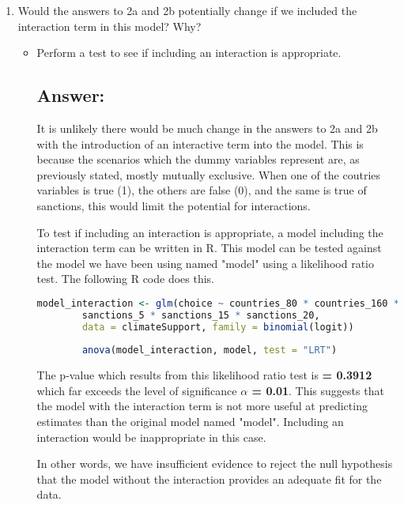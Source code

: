 \documentclass[12pt,letterpaper]{article}
\begin{document}
\begin{enumerate}
\begin{enumerate}
		\vspace{0.5cm}
		
		\item
		Would the answers to 2a and 2b potentially change if we included the interaction term in this model? Why? 
		\begin{itemize}
			\item Perform a test to see if including an interaction is appropriate.
		
		\subsection*{Answer:}
		
		It is unlikely there would be much change in the answers to 2a and 2b with the introduction of an interactive term into the model. This is because the scenarios which the dummy variables represent are, as previously stated, mostly mutually exclusive. When one of the coutries variables is true (1), the others are false (0), and the same is true of sanctions, this would limit the potential for interactions.
		
		\vspace{0.5cm}
		
		To test if including an interaction is appropriate, a model including the interaction term can be written in R. This model can be tested against the model we have been using named "model" using a likelihood ratio test. The following R code does this.
		
		\begin{lstlisting}[language=R]
		model_interaction <- glm(choice ~ countries_80 * countries_160 *
		sanctions_5 * sanctions_15 * sanctions_20, 
		data = climateSupport, family = binomial(logit))
		
		anova(model_interaction, model, test = "LRT")
		\end{lstlisting}
		
		The p-value  which results from this likelihood ratio test is \textbf{= 0.3912} which far exceeds the level of significance \textbf{$\alpha$ = 0.01}. This suggests that the model with the interaction term is not more useful at predicting estimates than the original model named "model". Including an interaction would be inappropriate in this case.
		
		In other words, we have insufficient evidence to reject the null hypothesis that the model without the interaction provides an adequate fit for the data.
		
		\end{itemize}
		

\end{enumerate}
\end{enumerate}
\end{document}
